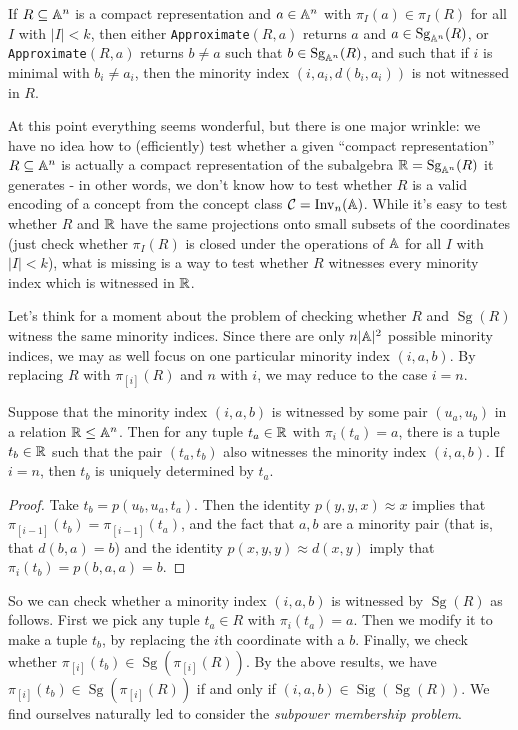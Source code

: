 \documentclass[letterpaper,11pt]{article}
\DeclareMathOperator{\Inv}{Inv}
\DeclareMathOperator{\Sg}{Sg}
\DeclareMathOperator{\Sig}{Sig}
\begin{document}
\begin{prop} If $R \subseteq \mathbb{A}^n$ is a compact representation and $a \in \mathbb{A}^n$ with $\pi_I(a) \in \pi_I(R)$ for all $I$ with $|I| < k$, then either \texttt{Approximate}$(R,a)$ returns $a$ and $a \in \Sg_{\bA^n}(R)$, or \texttt{Approximate}$(R,a)$ returns $b \ne a$ such that $b \in \Sg_{\bA^n}(R)$, and such that if $i$ is minimal with $b_i \ne a_i$, then the minority index $(i,a_i,d(b_i,a_i))$ is not witnessed in $R$.
\end{prop}

At this point everything seems wonderful, but there is one major wrinkle: we have no idea how to (efficiently) test whether a given ``compact representation'' $R \subseteq \mathbb{A}^n$ is actually a compact representation of the subalgebra $\RR = \Sg_{\bA^n}(R)$ it generates - in other words, we don't know how to test whether $R$ is a valid encoding of a concept from the concept class $\cC = \Inv_n(\bA)$. While it's easy to test whether $R$ and $\mathbb{R}$ have the same projections onto small subsets of the coordinates (just check whether $\pi_I(R)$ is closed under the operations of $\mathbb{A}$ for all $I$ with $|I| < k$), what is missing is a way to test whether $R$ witnesses every minority index which is witnessed in $\mathbb{R}$.

Let's think for a moment about the problem of checking whether $R$ and $\Sg(R)$ witness the same minority indices. Since there are only $n|\mathbb{A}|^2$ possible minority indices, we may as well focus on one particular minority index $(i,a,b)$. By replacing $R$ with $\pi_{[i]}(R)$ and $n$ with $i$, we may reduce to the case $i = n$.

\begin{prop} Suppose that the minority index $(i,a,b)$ is witnessed by some pair $(u_a,u_b)$ in a relation $\mathbb{R} \le \mathbb{A}^n$. Then for any tuple $t_a \in \mathbb{R}$ with $\pi_i(t_a) = a$, there is a tuple $t_b \in \mathbb{R}$ such that the pair $(t_a,t_b)$ also witnesses the minority index $(i,a,b)$. If $i = n$, then $t_b$ is uniquely determined by $t_a$.
\end{prop}
\begin{proof} Take $t_b = p(u_b,u_a,t_a)$. Then the identity $p(y,y,x)\approx x$ implies that $\pi_{[i-1]}(t_b) = \pi_{[i-1]}(t_a)$, and the fact that $a,b$ are a minority pair (that is, that $d(b,a) = b$) and the identity $p(x,y,y) \approx d(x,y)$ imply that $\pi_i(t_b) = p(b,a,a) = b$.
\end{proof}

So we can check whether a minority index $(i,a,b)$ is witnessed by $\Sg(R)$ as follows. First we pick any tuple $t_a \in R$ with $\pi_i(t_a) = a$. Then we modify it to make a tuple $t_b$, by replacing the $i$th coordinate with a $b$. Finally, we check whether $\pi_{[i]}(t_b) \in \Sg(\pi_{[i]}(R))$. By the above results, we have $\pi_{[i]}(t_b) \in \Sg(\pi_{[i]}(R))$ if and only if $(i,a,b) \in \Sig(\Sg(R))$. We find ourselves naturally led to consider the \emph{subpower membership problem}.
\end{document}
